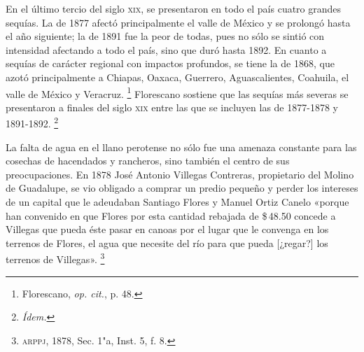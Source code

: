 \documentclass[14pt,twoside,final]{extbook} %
\let\oldfootnote\footnote
\renewcommand\footnote[1]{%
\oldfootnote{\hspace{1mm}#1}}
\begin{document}
En el último tercio del siglo \textsc{xix}, se presentaron en todo el país cuatro grandes sequías. La de 1877 afectó principalmente el valle de México y se prolongó hasta el año siguiente; la de 1891 fue la peor de todas, pues no sólo se sintió con intensidad afectando a todo el país, sino que duró hasta 1892. En cuanto a sequías de carácter regional con impactos profundos, se tiene la de 1868, que azotó principalmente a Chiapas, Oaxaca, Guerrero, Aguascalientes, Coahuila, el valle de México y Veracruz.\footnote{Florescano, \emph{op. cit.}, p. 48.} Florescano sostiene que las sequías más severas se presentaron a finales del siglo \textsc{xix} entre las que se incluyen las de 1877-1878 y 1891-1892.\footnote{\em Ídem.} \pagebreak[4]

La falta de agua en el llano perotense no sólo fue una amenaza constante para las cosechas de hacendados y rancheros, sino también el centro de sus preocupaciones. En 1878 José Antonio Villegas Contreras, propietario del Molino de Guadalupe, se vio obligado a comprar un predio pequeño y perder los intereses de un capital que le adeudaban Santiago Flores y Manuel Ortiz Canelo «porque han convenido en que Flores por esta cantidad rebajada de \$\,48.50 concede a Villegas que pueda éste pasar en canoas por el lugar que le convenga en los terrenos de Flores, el agua que necesite del río para que pueda [¿regar?] los terrenos de Villegas».\footnote{\textsc{arppj}, 1878, Sec. 1"a, Inst. 5, f. 8.}
\end{document}
